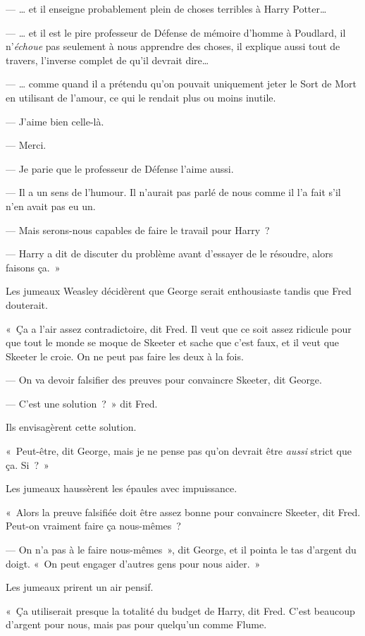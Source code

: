 --- … et il enseigne probablement plein de choses terribles à Harry Potter…

--- … et il est le pire professeur de Défense de mémoire d'homme à Poudlard, il n'\emph{échoue} pas seulement à nous apprendre des choses, il explique aussi tout de travers, l'inverse complet de qu'il devrait dire…

--- … comme quand il a prétendu qu'on pouvait uniquement jeter le Sort de Mort en utilisant de l'amour, ce qui le rendait plus ou moins inutile.

--- J'aime bien celle-là.

--- Merci.

--- Je parie que le professeur de Défense l'aime aussi.

--- Il a un sens de l'humour. Il n'aurait pas parlé de nous comme il l'a fait s'il n'en avait pas eu un.

--- Mais serons-nous capables de faire le travail pour Harry~?

--- Harry a dit de discuter du problème avant d'essayer de le résoudre, alors faisons ça.~»

Les jumeaux Weasley décidèrent que George serait enthousiaste tandis que Fred douterait.

«~Ça a l'air assez contradictoire, dit Fred. Il veut que ce soit assez ridicule pour que tout le monde se moque de Skeeter et sache que c'est faux, et il veut que Skeeter le croie. On ne peut pas faire les deux à la fois.

--- On va devoir falsifier des preuves pour convaincre Skeeter, dit George.

--- C'est une solution~?~» dit Fred.

Ils envisagèrent cette solution.

«~Peut-être, dit George, mais je ne pense pas qu'on devrait être \emph{aussi} strict que ça. Si~?~»

Les jumeaux haussèrent les épaules avec impuissance.

«~Alors la preuve falsifiée doit être assez bonne pour convaincre Skeeter, dit Fred. Peut-on vraiment faire ça nous-mêmes~?

--- On n'a pas à le faire nous-mêmes~», dit George, et il pointa le tas d'argent du doigt. «~On peut engager d'autres gens pour nous aider.~»

Les jumeaux prirent un air pensif.

«~Ça utiliserait presque la totalité du budget de Harry, dit Fred. C'est beaucoup d'argent pour nous, mais pas pour quelqu'un comme Flume.

